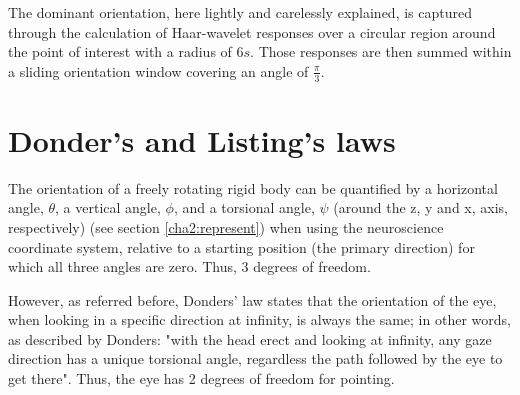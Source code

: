 The dominant orientation, here lightly and carelessly explained, is captured through the calculation of Haar-wavelet responses over a circular region around the point of interest with a radius of 6$s$. Those responses are then summed within a sliding orientation window covering an angle of $\frac{\pi}{3}$. \cite{surf} \cite{compsiftsurf}

\section{Donder's and Listing's laws}
The orientation of a freely rotating rigid body can be quantified by a horizontal angle, $\theta$, a vertical angle, $\phi$,  and a torsional angle, $\psi$ (around the z, y and x, axis, respectively) (see section \ref{cha2:represent}) when using the neuroscience coordinate system, relative to a starting position (the primary direction) for which all three angles are zero. Thus, 3 degrees of freedom.

However, as referred before, Donders' law states that the orientation of the eye, when looking in a specific direction at infinity, is always the same; in other words, as described by Donders: 
"with the head erect and looking at infinity, any gaze direction has a unique torsional angle, regardless the path followed by the eye to get there". Thus, the eye has 2 degrees of freedom for pointing.

